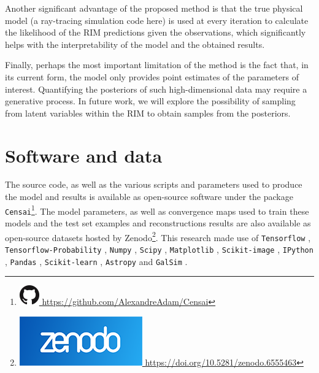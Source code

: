 Another significant advantage of the proposed method is that the true physical model (a ray-tracing simulation code here) is used at every iteration to calculate the likelihood of the RIM predictions given the observations, which significantly helps with the interpretability of the model and the obtained results. 

Finally, perhaps the most important limitation of the method is the fact that, in its current form, the model only provides point estimates of the parameters of interest. Quantifying the posteriors of such high-dimensional data may require a generative process. In future work, we will explore the possibility of sampling from latent variables within the RIM to obtain samples from the posteriors.  

\section*{Software and data}
The source code, as well as the various scripts and parameters used to 
produce the model and results is available as open-source software 
under the package \texttt{Censai}\footnote{
\href{https://github.com/AlexandreAdam/Censai}{
\includegraphics[scale=0.25]{figures/GitHub-Mark-32px.png}
https://github.com/AlexandreAdam/Censai}}. 
The model parameters, as well as convergence maps used to train 
these models and the test set examples and reconstructions results are also available as open-source datasets hosted by Zenodo\footnote{\href{https://doi.org/10.5281/zenodo.6555463}
{\includegraphics[scale=0.1]{figures/zenodo}
https://doi.org/10.5281/zenodo.6555463}}. This research made use of \texttt{Tensorflow} \citep{tensorflow}, 
\texttt{Tensorflow-Probability} \citep{tensorflow-probability}, 
\texttt{Numpy} \citep{numpy}, 
\texttt{Scipy} \citep{scipy}, 
\texttt{Matplotlib} \citep{matplotlib}, 
\texttt{Scikit-image} \citep{scikit-image}, 
\texttt{IPython} \citep{ipython}, 
\texttt{Pandas} \citep{pandas1,pandas2}, 
\texttt{Scikit-learn} \citep{scikit-learn}, 
\texttt{Astropy} \citep{astropy:2013,astropy:2018} 
and \texttt{GalSim} \citep{galsim}.


